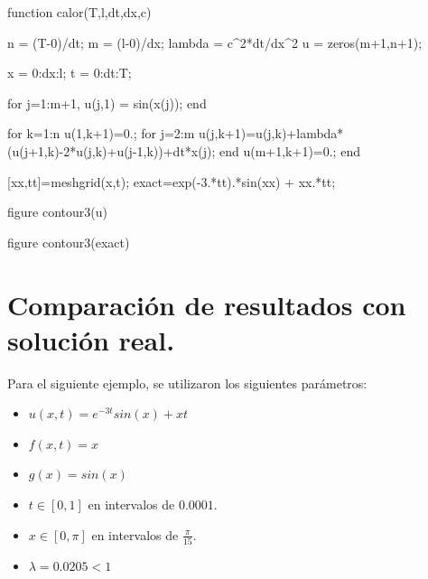 \documentclass[12pt,letterpaper]{article}
\begin{document}
\begin{verbatimtab}
function calor(T,l,dt,dx,c)

    n      = (T-0)/dt;
    m      = (l-0)/dx;
    lambda = c^2*dt/dx^2        %
    u      = zeros(m+1,n+1);

    x = 0:dx:l;
    t = 0:dt:T;

    for j=1:m+1,
        u(j,1) = sin(x(j));     %
    end

    for k=1:n
        u(1,k+1)=0.;            %
        for j=2:m
            u(j,k+1)=u(j,k)+lambda*(u(j+1,k)-2*u(j,k)+u(j-1,k))+dt*x(j);
        end
        u(m+1,k+1)=0.;          %
    end

    [xx,tt]=meshgrid(x,t);
    exact=exp(-3.*tt).*sin(xx) + xx.*tt;
    
    figure
    contour3(u)
    
    figure
    contour3(exact)
\end{verbatimtab}


\section{Comparación de resultados con solución real.}
Para el siguiente ejemplo, se utilizaron los siguientes parámetros:
\begin{itemize}
	\item $u(x,t) = e^{-3t}sin(x) + xt$
	\item $f(x,t) = x$
	\item $g(x) = sin(x)$
	\item $t \in [0,1]$ en intervalos de $0.0001$.
	\item $x \in [0,\pi]$ en intervalos de $\frac{\pi}{15}$.
	\item $\lambda = 0.0205 < 1$
\end{itemize}
\end{document}
